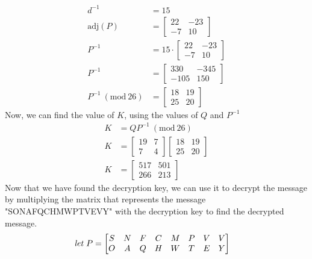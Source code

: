 \documentclass{../mathhomework}
\newcommand{\Mod}[1]{\ (\mathrm{mod}\ #1)}
\newcommand{\Adj}[1]{\mathrm{adj}(#1)}
\begin{document}
\begin{problem}
\begin{solution}
\begin{align}
            d^{-1} &= 15 \\
            \Adj{P} &= \begin{bmatrix}
                22 & -23 \\ -7 & 10
            \end{bmatrix} \\
            P^{-1} &= 15 \cdot \begin{bmatrix}
                22 & -23 \\ -7 & 10
            \end{bmatrix} \\
            P^{-1} & = \begin{bmatrix}
                330 & -345 \\ -105 & 150
            \end{bmatrix} \\
            P^{-1} \Mod{26} & = \begin{bmatrix}
                18 & 19 \\ 25 & 20
            \end{bmatrix}
        \end{align}
        Now, we can find the value of $K$, using the values of $Q$ and $P^{-1}$
        \begin{align}
            K &= QP^{-1} \Mod{26} \\
            K &= \begin{bmatrix}
                19 & 7 \\ 7 & 4
            \end{bmatrix} \begin{bmatrix}
                18 & 19 \\ 25 & 20
            \end{bmatrix}\\
            K & = \begin{bmatrix}
                517 & 501 \\ 266 & 213
            \end{bmatrix}
        \end{align}
        Now that we have found the decryption key, we can use it to decrypt the message by multiplying the matrix that represents the message "SONAFQCHMWPTVEVY" with the decryption key to find the decrypted message.
        \begin{align}
            \textit{let } P &= \begin{bmatrix}
                S & N & F & C & M & P & V & V \\
                O & A & Q & H & W & T & E & Y

\end{bmatrix}
\end{align}
\end{solution}
\end{problem}
\end{document}
